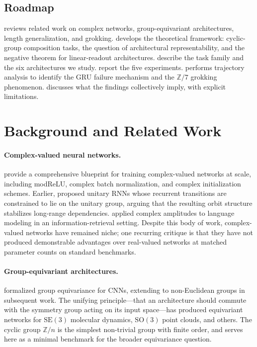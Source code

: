 \documentclass[11pt]{article}
\theoremstyle{definition}
\newcommand{\Z}{\mathbb{Z}}
\begin{document}
\subsection{Roadmap}

 reviews related work on complex networks,
group-equivariant architectures, length generalization, and grokking.
 develops the theoretical framework: cyclic-group
composition tasks, the question of architectural representability,
and the negative theorem for linear-readout architectures.
 describe the task family and the
six architectures we study. 
report the five experiments.  performs trajectory
analysis to identify the GRU failure mechanism and the $\Z/7$
grokking phenomenon.  discusses what the
findings collectively imply, with explicit limitations.


\section{Background and Related Work}
\label{sec:background}

\paragraph{Complex-valued neural networks.}
\citet{trabelsi2018deep} provide a comprehensive blueprint for
training complex-valued networks at scale, including modReLU,
complex batch normalization, and complex initialization schemes.
Earlier, \citet{arjovsky2016unitary} proposed unitary RNNs whose
recurrent transitions are constrained to lie on the unitary group,
arguing that the resulting orbit structure stabilizes long-range
dependencies. \citet{sordoni2013modeling} applied complex amplitudes
to language modeling in an information-retrieval setting. Despite
this body of work, complex-valued networks have remained niche; one
recurring critique is that they have not produced demonstrable
advantages over real-valued networks at matched parameter counts on
standard benchmarks.

\paragraph{Group-equivariant architectures.}
\citet{cohen2016group} formalized group equivariance for CNNs,
extending to non-Euclidean groups in subsequent work. The unifying
principle---that an architecture should commute with the symmetry
group acting on its input space---has produced equivariant networks
for $\mathrm{SE}(3)$ molecular dynamics, $\mathrm{SO}(3)$ point
clouds, and others. The cyclic group $\Z/n$ is the simplest
non-trivial group with finite order, and serves here as a minimal
benchmark for the broader equivariance question.
\end{document}
